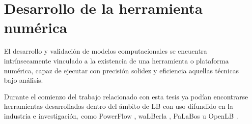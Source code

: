 \chapter{Desarrollo de la herramienta num\'erica}

El desarrollo y validaci\'on de modelos computacionales se encuentra intr\'insecamente vinculado a la existencia de una herramienta o plataforma num\'erica, capaz de ejecutar con precisi\'on solidez y eficiencia aquellas t\'ecnicas bajo an\'alisis.

Durante el comienzo del trabajo relacionado con esta tesis ya pod\'ian encontrarse herramientas desarrolladas dentro del \'ambito de LB con uso difundido en la industria e investigaci\'on, como PowerFlow \cite{noauthor_powerflow_nodate}, waLBerla \cite{noauthor_walberla_nodate}, PaLaBos \cite{latt_palabos_2020} u OpenLB \cite{noauthor_openlb_nodate}.